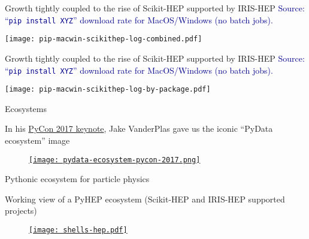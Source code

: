 \begin{frame}{Growth tightly coupled to the rise of Scikit-HEP supported by IRIS-HEP}
\vspace{0.25 cm}
\textcolor{darkblue}{Source: ``\texttt{pip install XYZ}'' download rate for MacOS/Windows (no batch jobs).}

\vspace{0.1 cm}
\texttt{[image: pip-macwin-scikithep-log-combined.pdf]}
\end{frame}

\begin{frame}{Growth tightly coupled to the rise of Scikit-HEP supported by IRIS-HEP}
\vspace{0.25 cm}
\textcolor{darkblue}{Source: ``\texttt{pip install XYZ}'' download rate for MacOS/Windows (no batch jobs).}

\vspace{0.1 cm}
\texttt{[image: pip-macwin-scikithep-log-by-package.pdf]}
\end{frame}

\begin{frame}{Ecosystems}
\vspace{0.25 cm}
\begin{center}
    {\small In his \href{https://youtu.be/ZyjCqQEUa8o}{PyCon 2017 keynote}, Jake VanderPlas gave us the iconic ``PyData ecosystem'' image}
\end{center}

\vspace{0.1 cm}
\begin{figure}
    \begin{center}
        \href{https://coiled.io/blog/pydata-dask/}{\texttt{[image: pydata-ecosystem-pycon-2017.png]}}
    \end{center}
\end{figure}
\end{frame}

\begin{frame}{Pythonic ecosystem for particle physics}
\vspace{0.25 cm}
\begin{center}
    {\small Working view of a PyHEP ecosystem (Scikit-HEP and IRIS-HEP supported projects)}
\end{center}

\begin{figure}
    \begin{center}
        \href{https://indico.cern.ch/event/1140031/}{\texttt{[image: shells-hep.pdf]}}
    \end{center}
\end{figure}
\end{frame}

